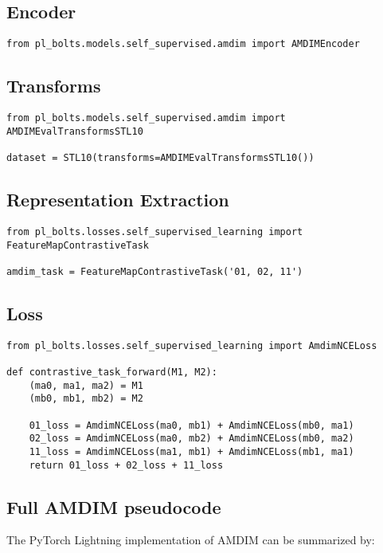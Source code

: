 \documentclass{article}
\begin{document}
\subsection{Encoder}

\begin{lstlisting}
from pl_bolts.models.self_supervised.amdim import AMDIMEncoder
\end{lstlisting}

\subsection{Transforms}
\begin{lstlisting}
from pl_bolts.models.self_supervised.amdim import AMDIMEvalTransformsSTL10

dataset = STL10(transforms=AMDIMEvalTransformsSTL10())
\end{lstlisting}

\subsection{Representation Extraction}
\begin{lstlisting}
from pl_bolts.losses.self_supervised_learning import FeatureMapContrastiveTask

amdim_task = FeatureMapContrastiveTask('01, 02, 11')
\end{lstlisting}

\subsection{Loss}

\begin{lstlisting}
from pl_bolts.losses.self_supervised_learning import AmdimNCELoss

def contrastive_task_forward(M1, M2):
    (ma0, ma1, ma2) = M1
    (mb0, mb1, mb2) = M2
        
    01_loss = AmdimNCELoss(ma0, mb1) + AmdimNCELoss(mb0, ma1) 
    02_loss = AmdimNCELoss(ma0, mb2) + AmdimNCELoss(mb0, ma2) 
    11_loss = AmdimNCELoss(ma1, mb1) + AmdimNCELoss(mb1, ma1)
    return 01_loss + 02_loss + 11_loss
\end{lstlisting}

\subsection{Full AMDIM pseudocode}
The PyTorch Lightning implementation of AMDIM can be summarized by:
\end{document}
